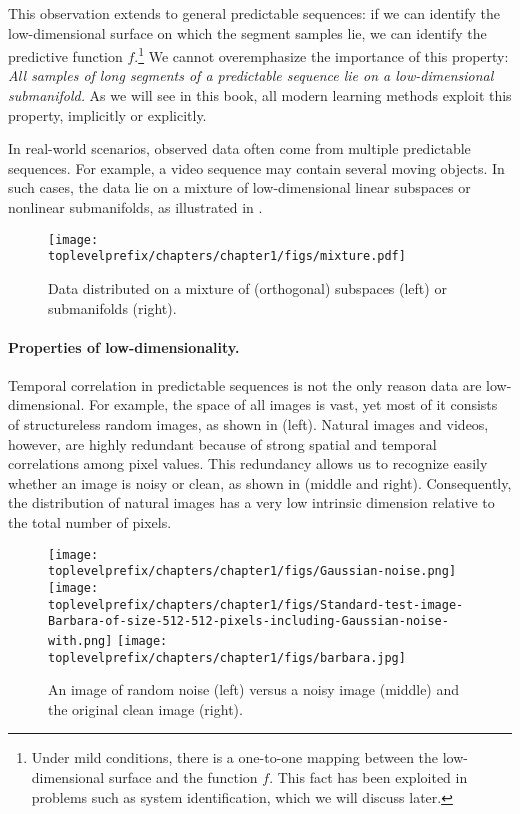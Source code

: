 \documentclass[../../book-main.tex]{subfiles}
\begin{document}
This observation extends to general predictable sequences: if we can identify the low-dimensional surface on which the segment samples lie, we can identify the predictive function $f$.\footnote{Under mild conditions, there is a one-to-one mapping between the low-dimensional surface and the function $f$. This fact has been exploited in problems such as system identification, which we will discuss later.} We cannot overemphasize the importance of this property: \textit{All samples of long segments of a predictable sequence lie on a low-dimensional submanifold.} As we will see in this book, all modern learning methods exploit this property, implicitly or explicitly.

In real-world scenarios, observed data often come from multiple predictable sequences. For example, a video sequence may contain several moving objects. In such cases, the data lie on a mixture of low-dimensional linear subspaces or nonlinear submanifolds, as illustrated in . 
\begin{figure}
    \centering
    \texttt{[image: \\toplevelprefix/chapters/chapter1/figs/mixture.pdf]}
    \caption{Data distributed on a mixture of (orthogonal) subspaces (left) or submanifolds (right).}
    \label{fig:mixture-models}
\end{figure}


\paragraph{Properties of low-dimensionality.}
Temporal correlation in predictable sequences is not the only reason data are low-dimensional. For example, the space of all images is vast, yet most of it consists of structureless random images, as shown in  (left). Natural images and videos, however, are highly redundant because of strong spatial and temporal correlations among pixel values. This redundancy allows us to recognize easily whether an image is noisy or clean, as shown in  (middle and right). Consequently, the distribution of natural images has a very low intrinsic dimension relative to the total number of pixels.

\begin{figure}
    \centering
    \texttt{[image: \\toplevelprefix/chapters/chapter1/figs/Gaussian-noise.png]}\hspace{2mm} 
    \texttt{[image: \\toplevelprefix/chapters/chapter1/figs/Standard-test-image-Barbara-of-size-512-512-pixels-including-Gaussian-noise-with.png]} \hspace{2mm} 
    \texttt{[image: \\toplevelprefix/chapters/chapter1/figs/barbara.jpg]}
    \caption{An image of random noise (left) versus a noisy image (middle) and the original clean image (right).}
    \label{fig:noise-image}
\end{figure}
\end{document}
